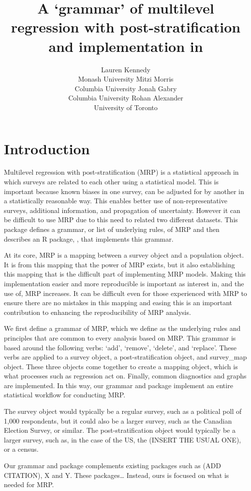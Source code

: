 \documentclass[
]{jss}
\author{
Lauren Kennedy\\Monash University \And Mitzi Morris\\Columbia University \And Jonah Gabry\\Columbia University \And Rohan Alexander\\University of Toronto
}
\title{\pkg{MRP-Kit} A `grammar' of multilevel regression with
post-stratification and implementation in \proglang{R}}
\begin{document}
\section[Introduction]{Introduction} \label{sec:intro}

Multilevel regression with post-stratification (MRP) is a statistical
approach in which surveys are related to each other using a statistical
model. This is important because known biases in one survey, can be
adjusted for by another in a statistically reasonable way. This enables
better use of non-representative surveys, additional information, and
propagation of uncertainty. However it can be difficult to use MRP due
to this need to related two different datasets. This package defines a
grammar, or list of underlying rules, of MRP and then describes an R
package, , that implements this grammar.

At its core, MRP is a mapping between a survey object and a population
object. It is from this mapping that the power of MRP exists, but it
also establishing this mapping that is the difficult part of
implementing MRP models. Making this implementation easier and more
reproducible is important as interest in, and the use of, MRP increases.
It can be difficult even for those experienced with MRP to ensure there
are no mistakes in this mapping and easing this is an important
contribution to enhancing the reproducibility of MRP analysis.

We first define a grammar of MRP, which we define as the underlying
rules and principles that are common to every analysis based on MRP.
This grammar is based around the following verbs: `add', `remove',
`delete', and `replace'. These verbs are applied to a survey object, a
post-stratification object, and survey\_map object. These three objects
come together to create a mapping object, which is what processes such
as regression act on. Finally, common diagnostics and graphs are
implemented. In this way, our grammar and package implement an entire
statistical workflow for conducting MRP.

The survey object would typically be a regular survey, such as a
political poll of 1,000 respondents, but it could also be a larger
survey, such as the Canadian Election Survey, or similar. The
post-stratification object would typically be a larger survey, such as,
in the case of the US, the (INSERT THE USUAL ONE), or a census.

Our grammar and package complements existing packages such as
 (ADD CITATION), X and Y. These packages\ldots{}
Instead, ours is focused on what is needed for MRP.
\end{document}
